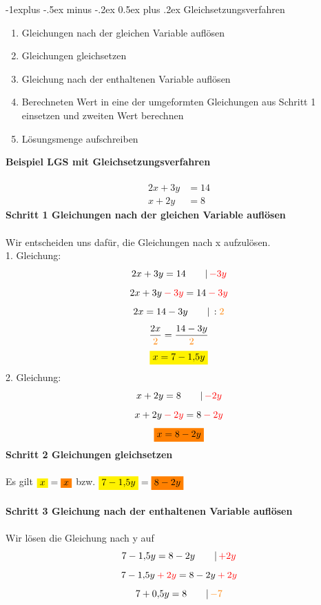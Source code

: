 \documentclass[a4paper,10pt]{article}
\makeatletter
\renewcommand{\subsection}{\@startsection{subsection}{2}{0mm}%
                                {-1explus -.5ex minus -.2ex}%
                                {0.5ex plus .2ex}%
                                {\normalfont\normalsize\bfseries}}
\makeatother
\begin{document}
\begin{multicols}{3}
    \subsection{Gleichsetzungsverfahren}
    \begin{enumerate}
        \item Gleichungen nach der gleichen Variable auflösen
        \item Gleichungen gleichsetzen
        \item Gleichung nach der enthaltenen Variable auflösen
        \item Berechneten Wert in eine der umgeformten Gleichungen aus Schritt 1 einsetzen und zweiten Wert berechnen
        \item Lösungsmenge aufschreiben
    \end{enumerate}
    \textbf{Beispiel LGS mit Gleichsetzungsverfahren}\\~\\
    \begin{align*} 2x + 3y &= 14 \\ x + 2y &= 8 \end{align*}
    \textbf{Schritt 1 Gleichungen nach der gleichen Variable auflösen}\\~\\
    Wir entscheiden uns dafür, die Gleichungen nach x aufzulösen. \\
    1. Gleichung:
    \[2x + 3y = 14 \qquad |\, {\color{red}-3y}\]
    \[2x + 3y {\color{red}\: - \: 3y} = 14 {\color{red}\: - \: 3y}\]
    \[2x = 14 - 3y \qquad |\, :{\color{orange}2}\]
    \[\frac{2x}{{\color{orange}2}} = \frac{14 - 3y}{{\color{orange}2}}\]
    \[{\colorbox{yellow}{$x = 7 - 1{,}5y$}}\]
    2. Gleichung:
    \[x + 2y = 8 \qquad |\, {\color{red}-2y}\]
    \[x + 2y {\color{red}\: - \: 2y} = 8 {\color{red}\: - \: 2y}\]
    \[{\colorbox{orange}{$x = 8 - 2y$}}\]
    \textbf{Schritt 2 Gleichungen gleichsetzen}\\~\\
    Es gilt ${\colorbox{yellow}{$x$}} = {\colorbox{orange}{$x$}}$ bzw. ${\colorbox{yellow}{$7 - 1{,}5y$}} = {\colorbox{orange}{$8 - 2y$}}$\\~\\
    \textbf{Schritt 3 Gleichung nach der enthaltenen Variable auflösen}\\~\\
    Wir lösen die Gleichung nach y auf
    \[7 - 1{,}5y = 8 - 2y \qquad |\, {\color{red}+2y}\]
    \[7 - 1{,}5y {\color{red} \: + \: 2y} = 8 - 2y {\color{red}\: + \: 2y}\]
    \[7 + 0{,}5y = 8 \qquad |\, {\color{orange}-7}\]

\end{multicols}
\end{document}
